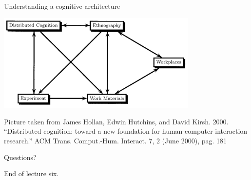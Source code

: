 \documentclass{beamer}
\begin{document}
\begin{frame}
{\centerline{Understanding a cognitive architecture}}

\begin{center}
 \includegraphics[width=10cm]{P2023.AIBCCSS.ExtendedMindDistributedCognitionSystemicThinking/networkDistributedCognition.jpg}
 
 \end{center}

\begin{center}
 \tiny{Picture taken from James Hollan, Edwin Hutchins, and David Kirsh. 2000. ``Distributed cognition: toward a new foundation for human-computer interaction research.'' ACM Trans. Comput.-Hum. Interact. 7, 2 (June 2000), pag. 181}
 \end{center}

\end{frame}


\begin{frame}
{\centerline{Questions?}}
\vspace{1cm}
\begin{center}
    \LARGE{End of lecture six.}
\end{center}

\end{frame}
\end{document}
